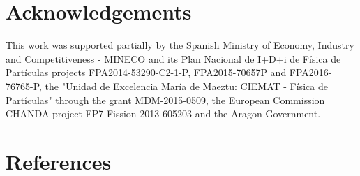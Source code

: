\documentclass[review,number,sort&compress]{elsarticle}
\begin{document}
\section*{Acknowledgements}
This work was supported partially by the Spanish Ministry of Economy, Industry and Competitiveness - MINECO and its Plan Nacional de I+D+i de F\'{i}sica de Part\'{i}culas projects FPA2014-53290-C2-1-P,  FPA2015-70657P and FPA2016-76765-P, the "Unidad de Excelencia Mar\'{i}a de Maeztu: CIEMAT - F\'{i}sica de Part\'{i}culas" through the grant MDM-2015-0509, the European Commission CHANDA project FP7-Fission-2013-605203 and the Aragon Government.

\section*{References}
\end{document}
